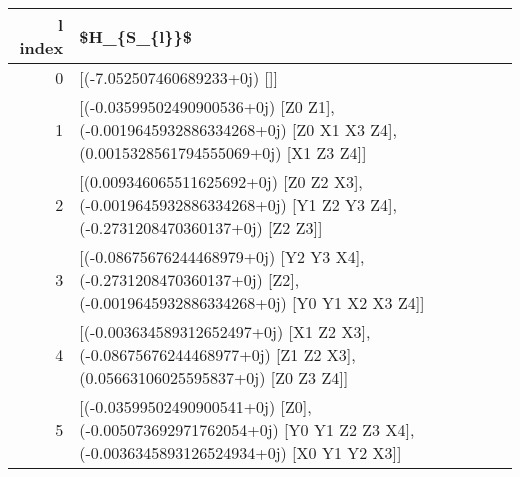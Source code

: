\begin{tabular}{rl}
\toprule
 l index &                                                                                                                                                                                                                                                                                                                                                              \$H\_\{S\_\{l\}\}\$ \\
\midrule
       0 &                                                                                                                                                                                                                                                                                                                                             [(-7.052507460689233+0j) []] \\
       1 &                                                                                                                                                                                                                                                    [(-0.03599502490900536+0j) [Z0 Z1], (-0.0019645932886334268+0j) [Z0 X1 X3 Z4], (0.0015328561794555069+0j) [X1 Z3 Z4]] \\
       2 &                                                                                                                                                                                                                                                      [(0.009346065511625692+0j) [Z0 Z2 X3], (-0.0019645932886334268+0j) [Y1 Z2 Y3 Z4], (-0.2731208470360137+0j) [Z2 Z3]] \\
       3 &                                                                                                                                                                                                                                                      [(-0.08675676244468979+0j) [Y2 Y3 X4], (-0.2731208470360137+0j) [Z2], (-0.0019645932886334268+0j) [Y0 Y1 X2 X3 Z4]] \\
       4 &                                                                                                                                                                                                                                                       [(-0.003634589312652497+0j) [X1 Z2 X3], (-0.08675676244468977+0j) [Z1 Z2 X3], (0.05663106025595837+0j) [Z0 Z3 Z4]] \\
       5 &                                                                                                                                                                                                                                                 [(-0.03599502490900541+0j) [Z0], (-0.005073692971762054+0j) [Y0 Y1 Z2 Z3 X4], (-0.0036345893126524934+0j) [X0 Y1 Y2 X3]] \\

\end{tabular}
